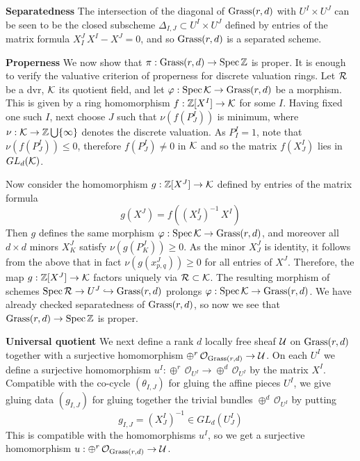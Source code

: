 \begin{construction}
\medskip

\textbf{Separatedness }
The intersection of the diagonal of $\operatorname{Grass}(r,d)$ with $U^I\times U^J$
can be seen to be the closed subscheme $\Delta_{I,J}\subset U^I\times U^J$
defined by entries of the matrix formula $X^J_I\,X^I - X^J =0$,
and so $\operatorname{Grass}(r,d)$ is a separated scheme.


\medskip

\textbf{Properness }
We now show that $\pi : \operatorname{Grass}(r,d) \to \operatorname{Spec} \mathbb{Z}$ is proper. It is enough to
verify the valuative criterion of properness for discrete valuation rings.
Let $\mathcal{R}$ be a dvr, $\mathcal{K}$ its quotient field, and let
$\varphi : \operatorname{Spec} \mathcal{K} \to \operatorname{Grass}(r,d)$ be a morphism. This is given by
a ring homomorphism $f : \mathbb{Z}[X^I] \to \mathcal{K}$ for some $I$. Having fixed
one such $I$, next choose $J$ such that $\nu(f(P^I_J))$ is minimum,
where $\nu : \mathcal{K} \to \mathbb{Z}\bigcup \{ \infty\}$ denotes
the discrete valuation. As $P^I_I = 1$, note that
$\nu(f(P^I_J)) \le 0$, therefore
$f(P^I_J) \ne 0$ in $\mathcal{K}$ and so the matrix $f(X^I_J)$
lies in $GL_d(\mathcal{K})$.

Now consider the homomorphism
$g : \mathbb{Z}[X^J] \to \mathcal{K}$ defined by entries of the matrix formula
$$g(X^J) = f((X^I_J)^{-1}\,X^I)$$
Then $g$ defines the same morphism $\varphi : \operatorname{Spec} \mathcal{K} \to \operatorname{Grass}(r,d)$,
and moreover all $d\times d$ minors $X^J_K$ satisfy
$\nu(g(P^J_K)) \ge 0$.
As the minor $X^J_J$ is identity, it follows from the above that in fact
$\nu(g(x^J_{p,q}))\ge 0$ for all entries of $X^J$.
Therefore, the map $g : \mathbb{Z}[X^J] \to \mathcal{K}$
factors uniquely via $\mathcal{R} \subset \mathcal{K}$. The resulting morphism of
schemes $\operatorname{Spec} \mathcal{R} \to U^J \hookrightarrow \operatorname{Grass}(r,d)$ prolongs
$\varphi : \operatorname{Spec} \mathcal{K} \to \operatorname{Grass}(r,d)$. We have already checked
separatedness of $\operatorname{Grass}(r,d)$, so now we see that
$\operatorname{Grass}(r,d) \to \operatorname{Spec} \mathbb{Z}$ is proper.


\medskip



\textbf{Universal quotient }
We next define a rank $d$ locally free sheaf $\mathcal{U}$ on $\operatorname{Grass}(r,d)$
together with a surjective homomorphism $\oplus^r\,{\mathcal O}_{\operatorname{Grass}(r,d)} \to \mathcal{U}$.
On each $U^I$ we define a surjective homomorphism
$u^I :\oplus^r\,{\mathcal O}_{U^I} \to  \oplus^d\,{\mathcal O}_{U^I}$
by the matrix $X^I$. Compatible with the co-cycle $(\theta_{I,J})$
for gluing the affine pieces $U^I$, we give gluing data
$(g_{I,J})$ for gluing together the trivial bundles $\oplus^d\,{\mathcal O}_{U^I}$
by putting
$$g_{I,J} = (X^I_J)^{-1} \in GL_d(U^I_J)$$
This is compatible with the homomorphisms $u^I$,
so we get a surjective homomorphism
$u : \oplus^r\,{\mathcal O}_{\operatorname{Grass}(r,d)} \to \mathcal{U}$.



\end{construction}
